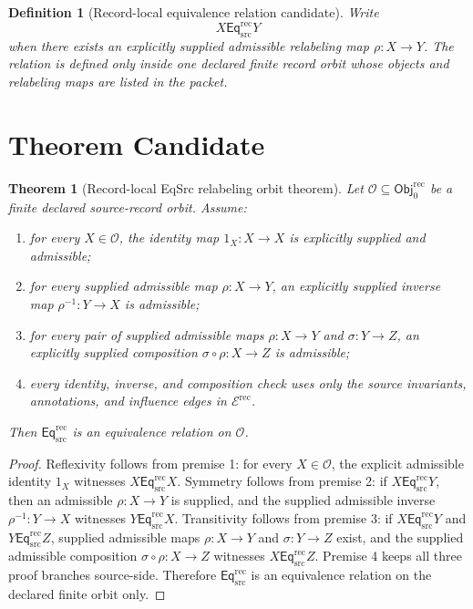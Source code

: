 \documentclass[11pt]{article}
\newcommand{\EqRec}{\mathsf{Eq}_{\mathrm{src}}^{\mathrm{rec}}}
\newcommand{\Obj}{\mathsf{Obj}_{0}^{\mathrm{rec}}}
\newtheorem{definition}{Definition}
\newtheorem{theorem}{Theorem}
\begin{document}
\begin{definition}[Record-local equivalence relation candidate]
Write
\[
  X\EqRec Y
\]
when there exists an explicitly supplied admissible relabeling map
\(\rho:X\to Y\). The relation is defined only inside one declared finite
record orbit whose objects and relabeling maps are listed in the packet.
\end{definition}

\section{Theorem Candidate}

\begin{theorem}[Record-local EqSrc relabeling orbit theorem]
Let \(\mathcal O\subseteq\Obj\) be a finite declared source-record orbit.
Assume:
\begin{enumerate}[leftmargin=*]
  \item for every \(X\in\mathcal O\), the identity map \(1_X:X\to X\) is
  explicitly supplied and admissible;
  \item for every supplied admissible map \(\rho:X\to Y\), an explicitly
  supplied inverse map \(\rho^{-1}:Y\to X\) is admissible;
  \item for every pair of supplied admissible maps \(\rho:X\to Y\) and
  \(\sigma:Y\to Z\), an explicitly supplied composition
  \(\sigma\circ\rho:X\to Z\) is admissible;
  \item every identity, inverse, and composition check uses only the source
  invariants, annotations, and influence edges in
  \(\mathcal E^{\mathrm{rec}}\).
\end{enumerate}
Then \(\EqRec\) is an equivalence relation on \(\mathcal O\).
\end{theorem}

\begin{proof}
Reflexivity follows from premise 1: for every \(X\in\mathcal O\), the
explicit admissible identity \(1_X\) witnesses \(X\EqRec X\). Symmetry
follows from premise 2: if \(X\EqRec Y\), then an admissible \(\rho:X\to Y\)
is supplied, and the supplied admissible inverse \(\rho^{-1}:Y\to X\)
witnesses \(Y\EqRec X\). Transitivity follows from premise 3: if
\(X\EqRec Y\) and \(Y\EqRec Z\), supplied admissible maps
\(\rho:X\to Y\) and \(\sigma:Y\to Z\) exist, and the supplied admissible
composition \(\sigma\circ\rho:X\to Z\) witnesses \(X\EqRec Z\). Premise 4
keeps all three proof branches source-side. Therefore \(\EqRec\) is an
equivalence relation on the declared finite orbit only.
\end{proof}
\end{document}
